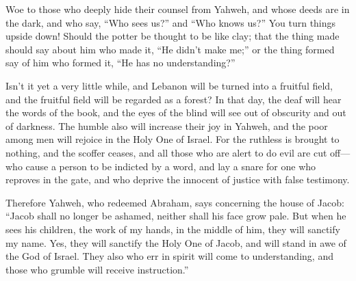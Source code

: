 {\par }{\PP {}Woe to those who deeply hide their counsel from Yahweh, and whose deeds are in the dark, and who say, “Who sees us?” and “Who knows us?”
You turn things upside down! Should the potter be thought to be like clay; that the thing made should say about him who made it, “He didn’t make me;” or the thing formed say of him who formed it, “He has no understanding?”
\par }{\PP {}Isn’t it yet a very little while, and Lebanon will be turned into a fruitful field, and the fruitful field will be regarded as a forest?
In that day, the deaf will hear the words of the book, and the eyes of the blind will see out of obscurity and out of darkness.
The humble also will increase their joy in Yahweh, and the poor among men will rejoice in the Holy One of Israel.
For the ruthless is brought to nothing, and the scoffer ceases, and all those who are alert to do evil are cut off—
who cause a person to be indicted by a word, and lay a snare for one who reproves in the gate, and who deprive the innocent of justice with false testimony.
\par }{\PP {}Therefore Yahweh, who redeemed Abraham, says concerning the house of Jacob: “Jacob shall no longer be ashamed, neither shall his face grow pale.
But when he sees his children, the work of my hands, in the middle of him, they will sanctify my name. Yes, they will sanctify the Holy One of Jacob, and will stand in awe of the God of Israel.
They also who err in spirit will come to understanding, and those who grumble will receive instruction.”

}
